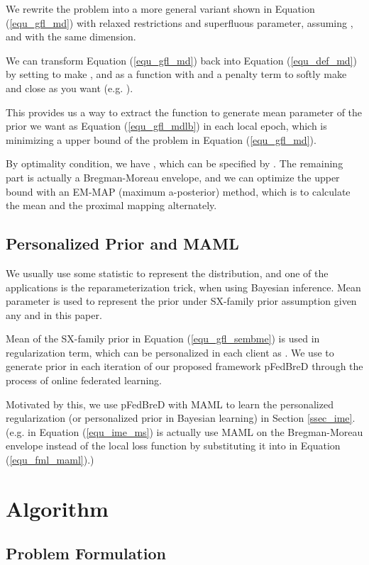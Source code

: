 \documentclass{article}
\begin{document}
We rewrite the problem into a more general variant shown in Equation (\ref{equ_gfl_md}) with relaxed restrictions and superfluous parameter, assuming ,  and  with the same dimension.

We can transform Equation (\ref{equ_gfl_md}) back into Equation (\ref{equ_def_md}) by setting  to make , and  as a function with  and a penalty term to softly make  and  close as you want (e.g. ).

This provides us a way to extract  the function to generate mean parameter of the prior we want as Equation (\ref{equ_gfl_mdlb}) in each local epoch, which is minimizing a upper bound of the problem in Equation (\ref{equ_gfl_md}).



By optimality condition, we have , which can be specified by . The remaining part is actually a Bregman-Moreau envelope, and we can optimize the upper bound with an EM-MAP (maximum a-posterior) method, which is to calculate  the mean and the proximal mapping  alternately.

\subsection{Personalized Prior and MAML}
\label{ssec_ppmaml}

We usually use some statistic to represent the distribution, and one of the applications is the reparameterization trick, when using Bayesian inference. Mean parameter is used to represent the prior under SX-family prior assumption given any  and  in this paper.

Mean of the SX-family prior in Equation (\ref{equ_gfl_sembme}) is used in regularization term, which can be personalized in each client  as . We use  to generate prior in each iteration of our proposed framework pFedBreD through the process of online federated learning.

Motivated by this, we use pFedBreD with MAML to learn the personalized regularization (or personalized prior in Bayesian learning) in Section \ref{ssec_ime}. (e.g.  in Equation (\ref{equ_ime_ms}) is actually use MAML on the Bregman-Moreau envelope  instead of the local loss function  by substituting it into  in Equation (\ref{equ_fml_maml}).)

\section{Algorithm}
\label{sec_alg}

\subsection{Problem Formulation}
\label{ssec_probf}
\end{document}
